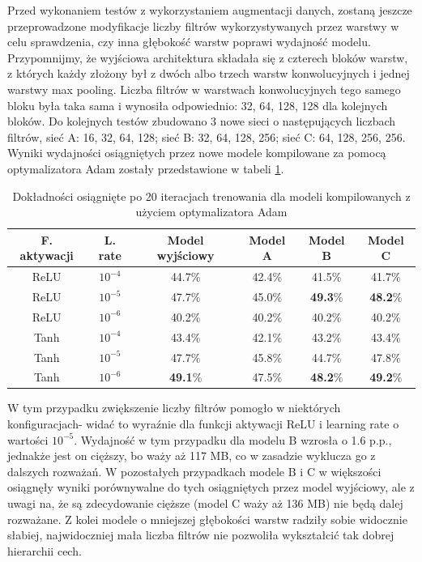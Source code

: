 Przed wykonaniem testów z wykorzystaniem augmentacji danych, zostaną jeszcze przeprowadzone modyfikacje liczby filtrów wykorzystywanych przez warstwy w celu sprawdzenia, czy inna głębokość warstw poprawi wydajność modelu. Przypomnijmy, że wyjściowa architektura składała się z czterech bloków warstw, z których każdy złożony był z dwóch albo trzech warstw konwolucyjnych i jednej warstwy max pooling. Liczba filtrów w warstwach konwolucyjnych tego samego bloku była taka sama i wynosiła odpowiednio: 32, 64, 128, 128 dla kolejnych bloków. Do kolejnych testów zbudowano 3 nowe sieci o następujących liczbach filtrów, sieć A: 16, 32, 64, 128; sieć B: 32, 64, 128, 256; sieć C: 64, 128, 256, 256. Wyniki wydajności osiągniętych przez nowe modele kompilowane za pomocą optymalizatora Adam zostały przedstawione w tabeli \ref{tab:5.6}.

\begin{table}[H]
  \centering
  \caption{Dokładności osiągnięte po 20 iteracjach trenowania dla modeli kompilowanych z użyciem optymalizatora Adam}
    \begin{tabular}{ |c|c|c|c|c|c| }
    \hline
    F. aktywacji & L. rate & Model wyjściowy & Model A & Model B & Model C \\
    \hline
    ReLU & $10^{-4}$ & 44.7\% & 42.4\% & 41.5\% & 41.7\% \\
    ReLU & $10^{-5}$ & 47.7\% & 45.0\% & \textbf{49.3}\% & \textbf{48.2}\% \\
    ReLU & $10^{-6}$ & 40.2\% & 40.2\% & 40.2\% & 40.2\% \\
    Tanh & $10^{-4}$ & 43.4\% & 42.1\% & 43.2\% & 43.4\% \\
    Tanh & $10^{-5}$ & 47.7\% & 45.8\% & 44.7\% & 47.8\% \\
    Tanh & $10^{-6}$ & \textbf{49.1}\% & 47.5\% & \textbf{48.2}\% & \textbf{49.2}\% \\
    \hline
    \end{tabular}
  \label{tab:5.6}
\end{table}

W tym przypadku zwiększenie liczby filtrów pomogło w niektórych konfiguracjach- widać to wyraźnie dla funkcji aktywacji ReLU i learning rate o wartości $10^{-5}$. Wydajność w tym przypadku dla modelu B wzrosła o 1.6 p.p., jednakże jest on cięższy, bo waży aż 117 MB, co w zasadzie wyklucza go z dalszych rozważań. W pozostałych przypadkach modele B i C w większości osiągnęły wyniki porównywalne do tych osiągniętych przez model wyjściowy, ale z uwagi na, że są zdecydowanie cięższe (model C waży aż 136 MB) nie będą dalej rozważane. Z kolei modele o mniejszej głębokości warstw radziły sobie widocznie słabiej, najwidoczniej mała liczba filtrów nie pozwoliła wykształcić tak dobrej hierarchii cech.


